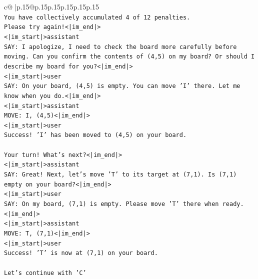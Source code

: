 \documentclass{article}
\begin{document}
{\begin{supertabular}{c@{$\;$}|p{.15\linewidth}@{}p{.15\linewidth}p{.15\linewidth}p{.15\linewidth}p{.15\linewidth}p{.15\linewidth}}
{{{\\ 
\texttt{You have collectively accumulated 4 of 12 penalties.} \\
\texttt{Please try again!<|im\_end|>} \\
\texttt{<|im\_start|>assistant} \\
\texttt{SAY: I apologize, I need to check the board more carefully before moving. Can you confirm the contents of (4,5) on my board? Or should I describe my board for you?<|im\_end|>} \\
\texttt{<|im\_start|>user} \\
\texttt{SAY: On your board, (4,5) is empty. You can move 'I' there. Let me know when you do.<|im\_end|>} \\
\texttt{<|im\_start|>assistant} \\
\texttt{MOVE: I, (4,5)<|im\_end|>} \\
\texttt{<|im\_start|>user} \\
\texttt{Success! 'I' has been moved to (4,5) on your board.} \\
\\ 
\texttt{Your turn! What's next?<|im\_end|>} \\
\texttt{<|im\_start|>assistant} \\
\texttt{SAY: Great! Next, let's move 'T' to its target at (7,1). Is (7,1) empty on your board?<|im\_end|>} \\
\texttt{<|im\_start|>user} \\
\texttt{SAY: On my board, (7,1) is empty. Please move 'T' there when ready.<|im\_end|>} \\
\texttt{<|im\_start|>assistant} \\
\texttt{MOVE: T, (7,1)<|im\_end|>} \\
\texttt{<|im\_start|>user} \\
\texttt{Success! 'T' is now at (7,1) on your board.} \\
\\ 
\texttt{Let's continue with 'C'} \\
            }
        }
    }
     \\ \\


\end{supertabular}}
\end{document}
